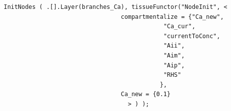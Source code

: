 %   
%   
%   
% 
% 
% 
% 


{\tiny
\begin{verbatim}
   InitNodes ( .[].Layer(branches_Ca), tissueFunctor("NodeInit", <
									compartmentalize = {"Ca_new", 
											    "Ca_cur", 
											    "currentToConc",
											    "Aii",
											    "Aim", 
											    "Aip", 
											    "RHS"
											   },
									Ca_new = {0.1}
								      > ) );
\end{verbatim}
}

